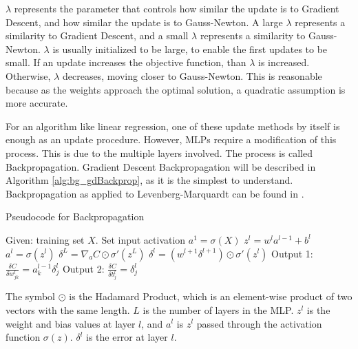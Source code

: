 \documentclass[11pt]{report}
\begin{document}
	\par $\lambda$ represents the parameter that controls how similar the update is to Gradient Descent, and how similar the update is to Gauss-Newton. A large $\lambda$ represents a similarity to Gradient Descent, and a small $\lambda$ represents a similarity to Gauss-Newton. $\lambda$ is usually initialized to be large, to enable the first updates to be small. If an update increases the objective function, than $\lambda$ is increased. Otherwise, $\lambda$ decreases, moving closer to Gauss-Newton. This is reasonable because as the weights approach the optimal solution, a quadratic assumption is more accurate.
	\par For an algorithm like linear regression, one of these update methods by itself is enough as an update procedure. However, MLPs require a modification of this process. This is due to the multiple layers involved. The process is called Backpropagation. Gradient Descent Backpropagation will be described in Algorithm \ref{alg:bg_gdBackprop}, as it is the simplest to understand. Backpropagation as applied to Levenberg-Marquardt can be found in \cite{lm-backprop}.
	\begin{algorithm}
		\caption{Pseudocode for Backpropagation}
		\label{alg:bg_gdBackprop}
		\begin{algorithmic}[1]
			\State Given: training set $X$.
			\State Set input activation $a^1=\sigma(X)$
			\State $z^l = w^l a^{l-1} +b^l$
			\State $a^l = \sigma(z^l)$ 
			\EndFor
			\State $\delta^L = \nabla_a C \odot \sigma '(z^L)$
			\State $\delta^l = (w^{l+1}\delta^{l+1}) \odot \sigma '(z^l)$
			\EndFor
			\State Output 1: $\frac{\delta C}{\delta w^{l}_{jk}} = a^{l-1}_{k}\delta^{l}_{j}$
			\State Output 2: $\frac{\delta C}{\delta b^{l}_{j}} = \delta^{l}_{j}$
			\EndProcedure
		\end{algorithmic}
	\end{algorithm}
	\par The symbol $\odot$ is the Hadamard Product, which is an element-wise product of two vectors with the same length. $L$ is the number of layers in the MLP. $z^l$ is the weight and bias values at layer $l$, and $a^l$ is $z^l$ passed through the activation function $\sigma(z)$. $\delta^l$ is the error at layer $l$.
\end{document}
